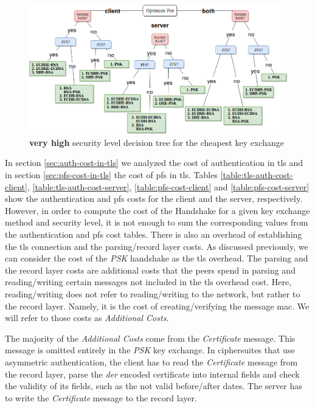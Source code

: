 \begin{figure}
  \centering
  \includegraphics[width=1.0\textwidth]{img/dt_veryhigh_sl.png}
  \centering \caption{\label{fig:dt-veryhigh-sl} \textbf{very high} security level decision tree for the cheapest key exchange}
\end{figure}

In section \ref{sec:auth-cost-in-tls} we analyzed the cost of authentication in \gls{tls} and in section \ref{sec:pfs-cost-in-tls}
the cost of \gls{pfs} in \gls{tls}. Tables \ref{table:tls-auth-cost-client}, \ref{table:tls-auth-cost-server},
\ref{table:pfs-cost-client} and \ref{table:pfs-cost-server} show the authentication and \gls{pfs} costs for the client and the server,
respectively. However, in order to compute the cost of the Handshake for a given key exchange method and security level, it
is not enough to sum the corresponding values from the authentication and \gls{pfs} cost tables. There is also an overhead of 
establishing the \gls{tls} connection and the parsing/record layer costs. As discussed previously, we can consider the cost of 
the \textit{PSK} handshake as the \gls{tls} overhead.
The parsing and the record layer costs are additional costs that the
peers spend in parsing and reading/writing certain messages not included in the \gls{tls} overhead cost.
Here, reading/writing does not refer to reading/writing to the network, but rather to the record layer. Namely, it is the cost of creating/verifying
the message \gls{mac}. We will refer to those costs as \textit{Additional Costs}.

The majority of the \textit{Additional Costs} come from the \textit{Certificate} message.
This message is omitted entirely in the \textit{PSK} key exchange. In ciphersuites that use asymmetric authentication,
the client has to read the  \textit{Certificate} message from the record layer, parse the \textit{der} encoded certificate into internal fields and
check the validity of its fields, such as the not valid before/after dates. The server has to write the \textit{Certificate} message to the
record layer.

